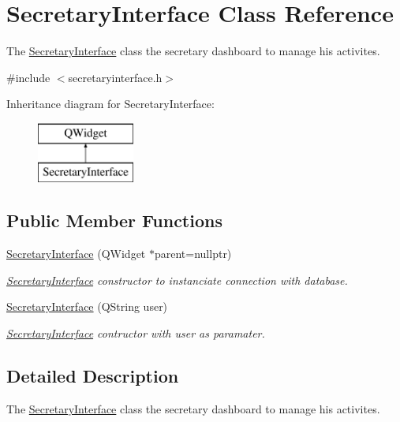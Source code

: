 \hypertarget{class_secretary_interface}{}\section{Secretary\+Interface Class Reference}
\label{class_secretary_interface}


The \mbox{\hyperlink{class_secretary_interface}{Secretary\+Interface}} class the secretary dashboard to manage his activites.  




{\ttfamily \#include $<$secretaryinterface.\+h$>$}

Inheritance diagram for Secretary\+Interface\+:\begin{figure}[H]
\begin{center}
\leavevmode
\includegraphics[height=2.000000cm]{class_secretary_interface}
\end{center}
\end{figure}
\subsection*{Public Member Functions}
\begin{DoxyCompactItemize}
\item 
\mbox{\hyperlink{class_secretary_interface_a821c94f865a2dc52e3c1e395202009b3}{Secretary\+Interface}} (Q\+Widget $\ast$parent=nullptr)
\begin{DoxyCompactList}\small\item\em \mbox{\hyperlink{class_secretary_interface}{Secretary\+Interface}} constructor to instanciate connection with database. \end{DoxyCompactList}\item 
\mbox{\hyperlink{class_secretary_interface_a9b2090ba8b53b60df97e0897400044cb}{Secretary\+Interface}} (Q\+String user)
\begin{DoxyCompactList}\small\item\em \mbox{\hyperlink{class_secretary_interface}{Secretary\+Interface}} contructor with user as paramater. \end{DoxyCompactList}\end{DoxyCompactItemize}


\subsection{Detailed Description}
The \mbox{\hyperlink{class_secretary_interface}{Secretary\+Interface}} class the secretary dashboard to manage his activites. 

